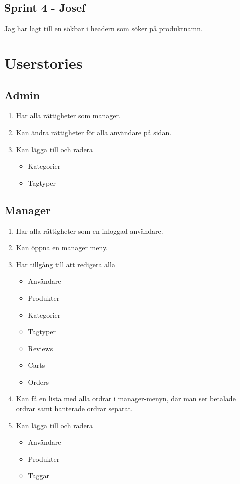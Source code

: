 \documentclass[a4paper]{article}
\begin{document}
\subsection{Sprint 4 - Josef}
Jag har lagt till en sökbar i headern som söker på produktnamn.


\section{Userstories}
\subsection{Admin}
\begin{enumerate}
  \item Har alla rättigheter som manager.
  \item Kan ändra rättigheter för alla användare på sidan.
  \item Kan lägga till och radera
  \begin{itemize}
    \item Kategorier
    \item Tagtyper
  \end{itemize}
\end{enumerate}
%
\subsection{Manager}
\begin{enumerate}
  \item Har alla rättigheter som en inloggad användare.
  \item Kan öppna en manager meny.
  \item Har tillgång till att redigera alla
  \begin{itemize}
    \item Användare
    \item Produkter
    \item Kategorier 
    \item Tagtyper
    \item Reviews
    \item Carts
    \item Orders
  \end{itemize}
  \item Kan få en lista med alla ordrar i manager-menyn, där man ser betalade ordrar samt hanterade ordrar separat.
  \item Kan lägga till och radera
  \begin{itemize}
  \item Användare
  \item Produkter
  \item Taggar
  \end{itemize}
\end{enumerate}
%
\end{document}
